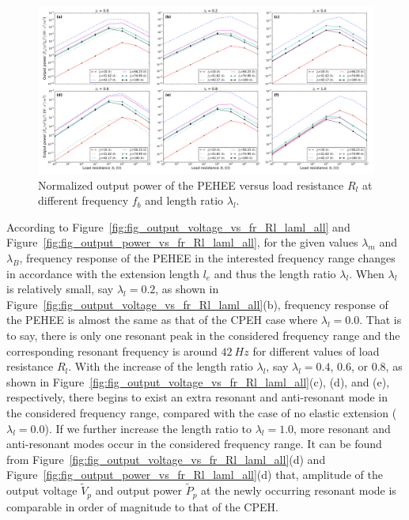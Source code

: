 \documentclass{elsarticle}
\begin{document}
\begin{figure}[!htbp]
    \centering
    \includegraphics[width=\textwidth]{./fig_pow_laml_list_vs_fr_Rl}
    \caption{ Normalized output power of the PEHEE versus load resistance $R_l$ at different frequency $f_b$ and length ratio $\lambda_l$. }
    \label{fig:fig_pow_laml_list_vs_fr_Rl}
\end{figure}


According to Figure~\ref{fig:fig_output_voltage_vs_fr_Rl_laml_all} and Figure~\ref{fig:fig_output_power_vs_fr_Rl_laml_all}, for the given values $\lambda_m$ and $\lambda_B$, frequency response of the PEHEE in the interested frequency range changes in accordance with the extension length $l_e$ and thus the length ratio $\lambda_l$. When $\lambda_l$ is relatively small, say $\lambda_l = 0.2$, as shown in Figure~\ref{fig:fig_output_voltage_vs_fr_Rl_laml_all}(b), frequency response of the PEHEE is almost the same as that of the CPEH case where $\lambda_l = 0.0$. That is to say, there is only one resonant peak in the considered frequency range and the corresponding resonant frequency is around $42\ Hz$ for different values of load resistance $R_l$. With the increase of the length ratio $\lambda_l$, say $\lambda_l = 0.4$, $0.6$, or $0.8$, as shown in Figure~\ref{fig:fig_output_voltage_vs_fr_Rl_laml_all}(c), (d), and (e), respectively, there begins to exist an extra resonant and anti-resonant mode in the considered frequency range, compared with the case of no elastic extension ($\lambda_l=0.0$). If we further increase the length ratio to $\lambda_l = 1.0$, more resonant and anti-resonant modes occur in the considered frequency range. It can be found from Figure~\ref{fig:fig_output_voltage_vs_fr_Rl_laml_all}(d) and Figure~\ref{fig:fig_output_power_vs_fr_Rl_laml_all}(d) that, amplitude of the output voltage $\tilde{V}_p$ and output power $\tilde{P}_p$ at the newly occurring resonant mode is comparable in order of magnitude to that of the CPEH. 
\end{document}

